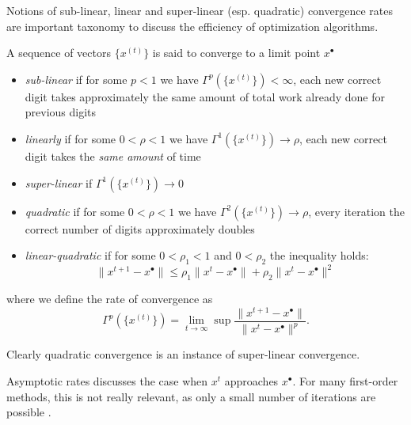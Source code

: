 \documentclass[preview, multi={definition, remark, theorem, proposition, example, literature}, border=0.2in]{standalone}
\newcommand{\optimal}[1]{{#1^{\scriptscriptstyle\bullet}}}
\begin{document}
\begin{definition}[label=v_o4l6wn, name=Asymptotic Convergence Rates]
	Notions of sub-linear, linear and super-linear (esp. quadratic) convergence rates are important taxonomy to discuss the efficiency of optimization algorithms.

	A sequence of vectors \( \{ x^{(t)} \} \) is said to converge to a limit point \( \optimal{x} \)
	\begin{itemize}
		\item \emph{sub-linear} if for some \( p < 1 \) we have \( \Gamma^p(\{x^{(t)} \}) < \infty \), each new correct digit takes approximately the same amount of total work already done for previous digits
		\item \emph{linearly} if for some \( 0 < \rho < 1 \) we have \(\Gamma^1(\{x^{(t)} \}) \to \rho\), each new correct digit takes the \emph{same amount} of time
		\item \emph{super-linear} if \( \Gamma^1(\{x^{(t)} \}) \to 0 \)
		\item \emph{quadratic} if for some \( 0 < \rho < 1 \) we have \( \Gamma^2(\{x^{(t)} \}) \to \rho \), every iteration the correct number of digits approximately doubles
		\item \emph{linear-quadratic} if for some \( 0 < \rho_1 < 1 \) and \( 0 < \rho_2 \) the inequality holds:
			\[
				\lVert x^{t+1} - \optimal{x}\rVert \leq \rho_1\lVert x^t - \optimal{x}\rVert + \rho_2\lVert x^t - \optimal{x}\rVert^2
			\]
	\end{itemize}
	where we define the rate of convergence as
	\[
		\Gamma^p(\{x^{(t)} \}) = \lim_{t\to\infty}\sup\frac{\lVert x^{t+1} - \optimal{x}\rVert}{\lVert x^t - \optimal{x}\rVert^p}.
	\]

	Clearly quadratic convergence is an instance of super-linear convergence.

	\begin{example}[label=ok2t_031, name=Sublinear Convergence in First-Order Methods]
		Asymptotic rates discusses the case when \( x^t \) approaches \( \optimal{x} \). For many first-order methods, this is not really relevant, as only a small number of iterations are possible \cite{sublinear_rate}.
	\end{example}

\end{definition}
\end{document}
